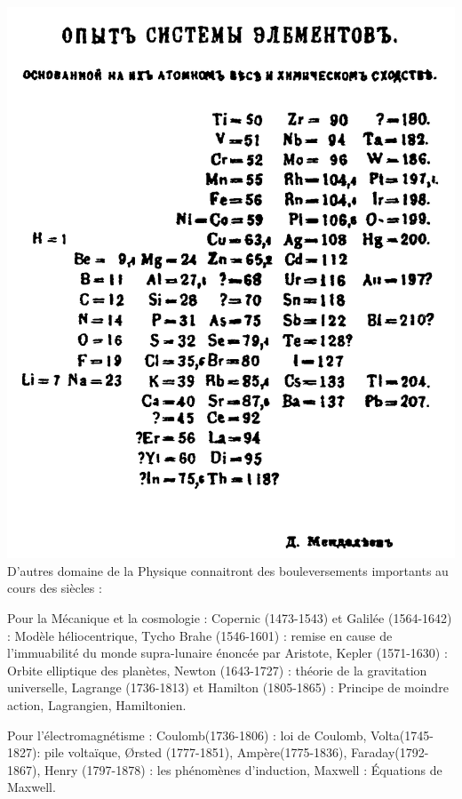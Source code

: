 \marginpar
{
	\vspace{2cm}
		\includegraphics[width=\marginparwidth]{SM/periodique.png}
    	\label{periodique}
}
D'autres domaine de la Physique connaitront des bouleversements importants au cours des siècles : 

Pour la Mécanique et la cosmologie : Copernic (1473-1543) et Galilée (1564-1642) : Modèle héliocentrique, Tycho Brahe (1546-1601) : remise en cause de  l'immuabilité du monde supra-lunaire énoncée par Aristote, Kepler (1571-1630) : Orbite elliptique des planètes, Newton (1643-1727) : théorie de la gravitation universelle, Lagrange (1736-1813) et Hamilton (1805-1865) : Principe de moindre action, Lagrangien, Hamiltonien.

Pour l'électromagnétisme : Coulomb(1736-1806) : loi de Coulomb, Volta(1745-1827): pile voltaïque, Ørsted (1777-1851), Ampère(1775-1836), Faraday(1792-1867), Henry (1797-1878) : les phénomènes d'induction, Maxwell : Équations de Maxwell.


